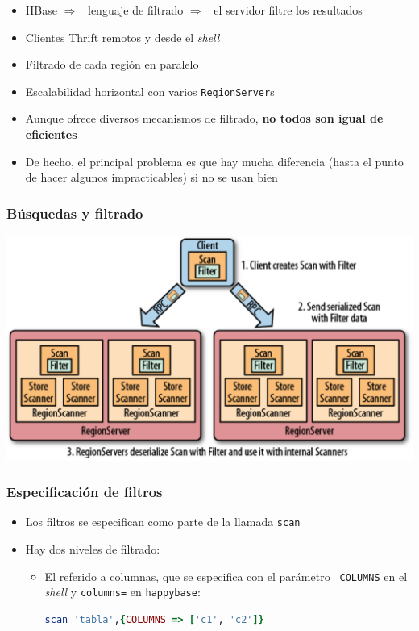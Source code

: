 \documentclass[14pt]{beamer}
\newcommand{\ra}{{\color{blue} $\Rightarrow${}~{}}}
\begin{document}
\begin{frame}
\begin{itemize}
\begin{frame}[allowframebreaks]
\begin{itemize}
\framebreak

\item HBase \ra{} lenguaje de filtrado \ra{} el servidor filtre los
  resultados
\item Clientes Thrift remotos y desde el {\em shell}
\item Filtrado de cada región en paralelo
\item Escalabilidad horizontal con varios {\tt RegionServer}s
\item Aunque ofrece diversos mecanismos de filtrado, {\bf no todos son
    igual de eficientes}
\item De hecho, el principal problema es que hay mucha diferencia (hasta el
  punto de hacer algunos impracticables) si no se usan bien
\end{itemize}
\end{frame}

\begin{frame}
  \frametitle{Búsquedas y filtrado}
  \includegraphics[width=\textwidth]{img/filter-region-server}
\end{frame}

\begin{frame}
  \frametitle{Especificación de filtros}
\begin{itemize}
\item Los filtros se especifican como parte de la llamada {\tt scan}
\item Hay dos niveles de filtrado:
  \begin{itemize}
  \item El referido a columnas, que se especifica con el parámetro {\tt
      COLUMNS} en el {\em shell\/} y {\tt columns=} en {\tt happybase}:

\begin{lstlisting}[language=ruby]
scan 'tabla',{COLUMNS => ['c1', 'c2']}
\end{lstlisting}


\end{itemize}
\end{itemize}
\end{frame}
\end{itemize}
\end{frame}
\end{document}
